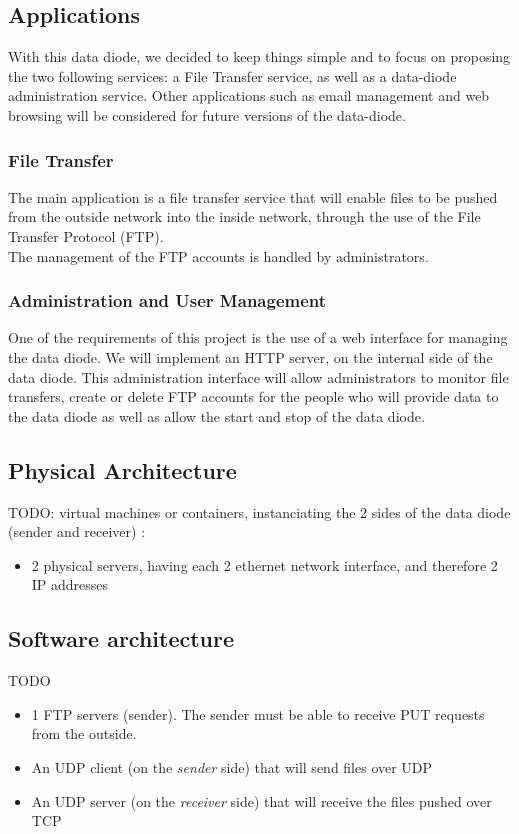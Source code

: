 \documentclass[a4paper,11pt]{article}
\begin{document}
\subsection{Applications}
With this data diode, we decided to keep things simple and to focus on proposing the two following services: a File Transfer service, as well as a data-diode administration service. 
Other applications such as email management and web browsing will be considered for future versions of the data-diode.

\subsubsection{File Transfer}
The main application is a file transfer service that will enable files to be pushed from the outside network into the inside network, through the use of the File Transfer Protocol (FTP).\\

The management of the FTP accounts is handled by administrators.

\subsubsection{Administration and User Management}
One of the requirements of this project is the use of a web interface for managing the data diode. We will implement an HTTP server, on the internal side of the data diode. This administration interface will allow administrators to monitor file transfers, create or delete FTP accounts for the people who will provide data to the data diode as well as allow the start and stop of the data diode.

\subsection{Physical Architecture}
TODO: virtual machines or containers, instanciating the 2 sides of the data diode (sender and receiver) :
\begin{itemize}
\item{2 physical servers, having each 2 ethernet network interface, and therefore 2 IP addresses}

\end{itemize}

\subsection{Software architecture}
TODO
\begin{itemize}
\item{1 FTP servers (sender). The sender must be able to receive PUT requests from the outside.}
\item{An UDP client (on the \textit{sender} side) that will send files over UDP}
\item{An UDP server (on the \textit{receiver }side)} that will receive the files pushed over TCP
\end{itemize}
\end{document}
